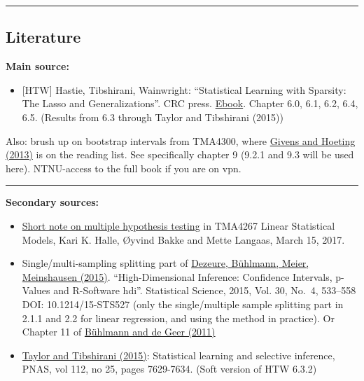 \documentclass[
  letterpaper,
  DIV=11,
  numbers=noendperiod]{scrartcl}
\providecommand{\tightlist}{%
  \setlength{\itemsep}{0pt}\setlength{\parskip}{0pt}}\usepackage{longtable,booktabs,array}
\begin{document}
\begin{center}\rule{0.5\linewidth}{0.5pt}\end{center}

\hypertarget{literature}{%
\subsection{Literature}\label{literature}}

\textbf{Main source:}

\begin{itemize}
\tightlist
\item
  {[}HTW{]} Hastie, Tibshirani, Wainwright: ``Statistical Learning with
  Sparsity: The Lasso and Generalizations''. CRC press.
  \href{https://trevorhastie.github.io/}{Ebook}. Chapter 6.0, 6.1, 6.2,
  6.4, 6.5. (Results from 6.3 through Taylor and Tibshirani (2015))
\end{itemize}

Also: brush up on bootstrap intervals from TMA4300, where
\href{https://onlinelibrary.wiley.com/doi/book/10.1002/9781118555552}{Givens
and Hoeting (2013)} is on the reading list. See specifically chapter 9
(9.2.1 and 9.3 will be used here). NTNU-access to the full book if you
are on vpn.

\begin{center}\rule{0.5\linewidth}{0.5pt}\end{center}

\textbf{Secondary sources:}

\begin{itemize}
\item
  \href{https://www.math.ntnu.no/emner/TMA4267/2017v/multtest.pdf}{Short
  note on multiple hypothesis testing} in TMA4267 Linear Statistical
  Models, Kari K. Halle, Øyvind Bakke and Mette Langaas, March 15, 2017.
\item
  Single/multi-sampling splitting part of
  \href{https://projecteuclid.org/download/pdfview_1/euclid.ss/1449670857}{Dezeure,
  Bühlmann, Meier, Meinshausen (2015)}. ``High-Dimensional Inference:
  Confidence Intervals, p-Values and R-Software hdi''. Statistical
  Science, 2015, Vol. 30, No.~4, 533--558 DOI: 10.1214/15-STS527 (only
  the single/multiple sample splitting part in 2.1.1 and 2.2 for linear
  regression, and using the method in practice). Or Chapter 11 of
  \href{https://link.springer.com/book/10.1007/978-3-642-20192-9}{Bühlmann
  and de Geer (2011)}
\item
  \href{https://www.pnas.org/content/112/25/7629}{Taylor and Tibshirani
  (2015)}: Statistical learning and selective inference, PNAS, vol 112,
  no 25, pages 7629-7634. (Soft version of HTW 6.3.2)
\end{itemize}
\end{document}

